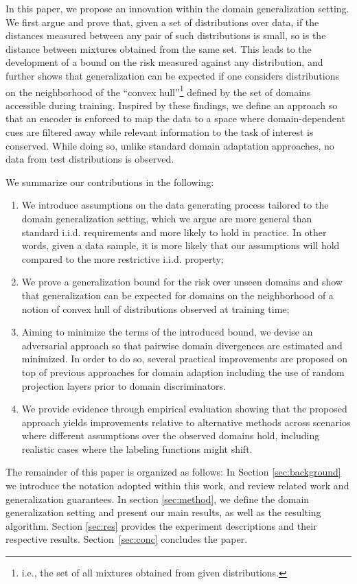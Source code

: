 \documentclass{article}
\begin{document}
In this paper, we propose an innovation within the domain generalization setting. We first argue and prove that, given a set of distributions over data, if the distances measured between any pair of such distributions is small, so is the distance between mixtures obtained from the same set. This leads to the development of a bound on the risk measured against any distribution, and further shows that generalization can be expected if one considers distributions on the neighborhood of the ``convex hull''\footnote{i.e., the set of all mixtures obtained from given distributions.} defined by the set of domains accessible during training. Inspired by these findings, we define an approach so that an encoder is enforced to map the data to a space where domain-dependent cues are filtered away while relevant information to the task of interest is conserved. While doing so, unlike standard domain adaptation approaches, no data from test distributions is observed. 

We summarize our contributions in the following:
\begin{enumerate}
    \item We introduce assumptions on the data generating process tailored to the domain generalization setting, which we argue are more general than standard i.i.d. requirements and more likely to hold in practice. In other words, given a data sample, it is more likely that our assumptions will hold compared to the more restrictive i.i.d. property;
    \item We prove a generalization bound for the risk over unseen domains and show that generalization can be expected for domains on the neighborhood of a notion of convex hull of distributions observed at training time;
    \item Aiming to minimize the terms of the introduced bound, we devise an adversarial approach so that pairwise domain divergences are estimated and minimized. In order to do so, several practical improvements are proposed on top of previous approaches for domain adaption including the use of random projection layers prior to domain discriminators.
    \item We provide evidence through empirical evaluation showing that the proposed approach yields improvements relative to alternative methods across scenarios where different assumptions over the observed domains hold, including realistic cases where the labeling functions might shift.
\end{enumerate}

The remainder of this paper is organized as follows: In Section \ref{sec:background} we introduce the notation adopted within this work, and review related work and generalization guarantees. In section \ref{sec:method}, we define the domain generalization setting and present our main results, as well as the resulting algorithm. Section \ref{sec:res} provides the experiment descriptions and their respective results. Section~\ref{sec:conc} concludes the paper.
\end{document}
